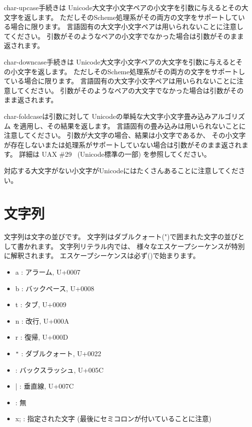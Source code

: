 \begin{entry}{%
}


{\cf char-upcase}手続きは
Unicode大文字小文字ペアの小文字を引数に与えるとその大文字を返します。
ただしそのScheme処理系がその両方の文字をサポートしている場合に限ります。
言語固有の大文字小文字ペアは用いられないことに注意してください。
引数がそのようなペアの小文字でなかった場合は引数がそのまま返されます。

{\cf char-downcase}手続きは
Unicode大文字小文字ペアの大文字を引数に与えるとその小文字を返します。
ただしそのScheme処理系がその両方の文字をサポートしている場合に限ります。
言語固有の大文字小文字ペアは用いられないことに注意してください。
引数がそのようなペアの大文字でなかった場合は引数がそのまま返されます。

{\cf char-foldcase}は引数に対して
Unicodeの単純な大文字小文字畳み込みアルゴリズム
を適用し、その結果を返します。
言語固有の畳み込みは用いられないことに注意してください。
引数が大文字の場合、結果は小文字であるか、
その小文字が存在しないまたは処理系がサポートしていない場合は引数がそのまま返されます。
詳細は UAX \#29~\cite{uax29} (Unicode標準の一部) を参照してください。

対応する大文字がない小文字がUnicodeにはたくさんあることに注意してください。

\end{entry}


\section{文字列}
\label{stringsection}

文字列は文字の並びです。
\vest 文字列はダブルクォート({\cf "})で囲まれた文字の並びとして書かれます。
文字列リテラル内では、
様々なエスケープシーケンスが特別に解釈されます。
エスケープシーケンスは必ず(\backwhack{})で始まります。

\begin{itemize}
\item{\cf\backwhack{}a} : アラーム, U+0007
\item{\cf\backwhack{}b} : バックペース, U+0008 
\item{\cf\backwhack{}t} : タブ, U+0009 
\item{\cf\backwhack{}n} : 改行, U+000A 
\item{\cf\backwhack{}r} : 復帰, U+000D 
\item{\cf\backwhack{}}\verb|"| : ダブルクォート, U+0022 
\item{\cf\backwhack{}\backwhack{}} : バックスラッシュ, U+005C 
\item{\cf\backwhack{}|} : 垂直線, U+007C
\item{\cf\backwhack{}
      } : 無
\item{\cf\backwhack{}x;} : 指定された文字
(最後にセミコロンが付いていることに注意)
\end{itemize}

